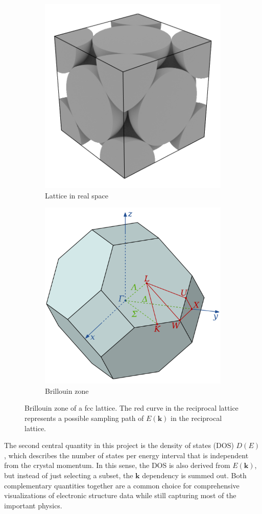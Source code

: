 \begin{figure}[htb!]
    \centering
    \begin{subfigure}{.5\textwidth}
        \centering
        \includegraphics[width=0.5\linewidth]{christian/fcc_real.png}
        \caption{Lattice in real space}
        \label{fig:fcc_real}
    \end{subfigure}%
    \begin{subfigure}{.5\textwidth}
        \centering
        \includegraphics[width=0.5\linewidth]{christian/Brillouin_Zone_(1st,_FCC).png}
        \caption{Brillouin zone}
        \label{fig:fcc_billouin}
    \end{subfigure}
    \caption[Brillouin zone of a fcc lattice]{Brillouin zone of a fcc lattice. The red curve in the reciprocal lattice represents a possible sampling path of $E(\mathbf{k})$ in the reciprocal lattice.}
    \label{fcc}
\end{figure}

The second central quantity in this project is the density of states (DOS) $D(E)$, which describes the number of states per energy interval that is independent from the crystal momentum. In this sense, the DOS is also derived from $E(\mathbf{k})$, but instead of just selecting a subset, the $\mathbf{k}$ dependency is summed out. Both complementary quantities together are a common choice for comprehensive visualizations of electronic structure data while still capturing most of the important physics. 

